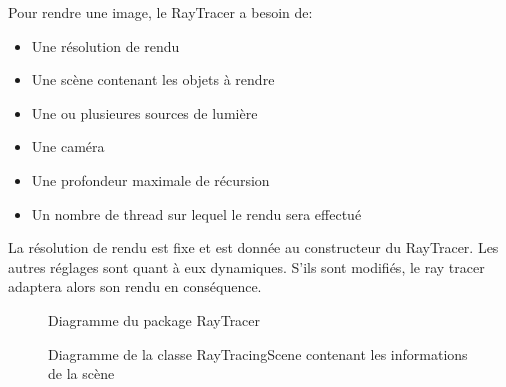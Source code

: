 \documentclass[../../Rapport RayTracer]{subfiles}
\begin{document}
Pour rendre une image, le RayTracer a besoin de:
\begin{itemize}
	\item{Une résolution de rendu}
	\item{Une scène contenant les objets à rendre}
	\item{Une ou plusieures sources de lumière}
	\item{Une caméra}
	\item{Une profondeur maximale de récursion}
	\item{Un nombre de thread sur lequel le rendu sera effectué}
\end{itemize}
La résolution de rendu est fixe et est donnée au constructeur du RayTracer. Les autres réglages sont quant à eux dynamiques. S'ils sont modifiés, le ray tracer adaptera alors son rendu en conséquence.

\begin{figure}[h!]
	
	\caption{Diagramme du package RayTracer}
	\label{diagrammeRayTracer}
\end{figure}
\FloatBarrier

\begin{figure}[h!]
	
	\caption{Diagramme de la classe RayTracingScene contenant les informations de la scène}
	\label{diagrammeRayTracingScene}
\end{figure}
\FloatBarrier
\end{document}

